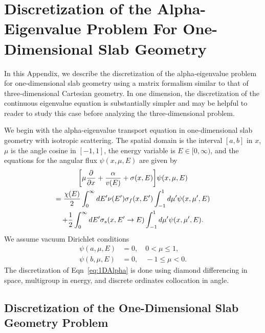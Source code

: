 \chapter{Discretization of the Alpha-Eigenvalue Problem For One-Dimensional Slab Geometry}

\label{Discrete1D}

In this Appendix, we describe the discretization of the alpha-eigenvalue problem for one-dimensional slab geometry using a matrix formalism similar to that of three-dimensional Cartesian geometry. In one dimension, the discretization of the continuous eigenvalue equation is substantially simpler and may be helpful to reader to study this case before analyzing the three-dimensional problem.

We begin with the alpha-eigenvalue transport equation in one-dimensional slab geometry with isotropic scattering. The spatial domain is the interval $[a,b]$ in $x$, $\mu$ is the angle cosine in $[-1,1]$, the energy variable is $E \in [0, \infty)$, and the equations for the angular flux $\psi(x, \mu, E)$ are given by
\begin{multline}
\bigg [ \mu \frac{\partial}{\partial x} + \frac{\alpha}{v(E)} + \sigma(x,E) \bigg ] \psi(x,\mu,E) \\ = \frac{\chi(E)}{2} \int_{0}^{\infty} \mathop{}\!d E' \nu(E') \sigma_{f}(x,E') \int_{-1}^{1} \mathop{}\!d \mu' \psi(x,\mu',E) \\ + \frac{1}{2} \int_{0}^{\infty} \mathop{}\!d E' \sigma_{s}(x, E' \rightarrow E) \int_{-1}^{1} \mathop{}\!d \mu' \psi(x,\mu',E).
\label{eq:1DAlpha}
\end{multline}
We assume vacuum Dirichlet conditions
\begin{align}
	\psi(a, \mu, E) &=0, \quad 0 < \mu \leq 1, \\
        \psi(b, \mu, E) &=0, \quad -1 \leq \mu < 0.
\end{align}
The discretization of Eqn~\ref{eq:1DAlpha} is done using diamond differencing in space, multigroup in energy, and discrete ordinates collocation in angle.

\section{Discretization of the One-Dimensional Slab Geometry Problem}

